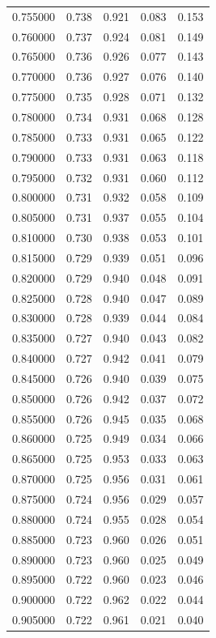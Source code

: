\begin{table}[htbp]
\begin{tabular}{lllll}
0.755000 & 0.738 & 0.921 & 0.083 & 0.153 \\
0.760000 & 0.737 & 0.924 & 0.081 & 0.149 \\
0.765000 & 0.736 & 0.926 & 0.077 & 0.143 \\
0.770000 & 0.736 & 0.927 & 0.076 & 0.140 \\
0.775000 & 0.735 & 0.928 & 0.071 & 0.132 \\
0.780000 & 0.734 & 0.931 & 0.068 & 0.128 \\
0.785000 & 0.733 & 0.931 & 0.065 & 0.122 \\
0.790000 & 0.733 & 0.931 & 0.063 & 0.118 \\
0.795000 & 0.732 & 0.931 & 0.060 & 0.112 \\
0.800000 & 0.731 & 0.932 & 0.058 & 0.109 \\
0.805000 & 0.731 & 0.937 & 0.055 & 0.104 \\
0.810000 & 0.730 & 0.938 & 0.053 & 0.101 \\
0.815000 & 0.729 & 0.939 & 0.051 & 0.096 \\
0.820000 & 0.729 & 0.940 & 0.048 & 0.091 \\
0.825000 & 0.728 & 0.940 & 0.047 & 0.089 \\
0.830000 & 0.728 & 0.939 & 0.044 & 0.084 \\
0.835000 & 0.727 & 0.940 & 0.043 & 0.082 \\
0.840000 & 0.727 & 0.942 & 0.041 & 0.079 \\
0.845000 & 0.726 & 0.940 & 0.039 & 0.075 \\
0.850000 & 0.726 & 0.942 & 0.037 & 0.072 \\
0.855000 & 0.726 & 0.945 & 0.035 & 0.068 \\
0.860000 & 0.725 & 0.949 & 0.034 & 0.066 \\
0.865000 & 0.725 & 0.953 & 0.033 & 0.063 \\
0.870000 & 0.725 & 0.956 & 0.031 & 0.061 \\
0.875000 & 0.724 & 0.956 & 0.029 & 0.057 \\
0.880000 & 0.724 & 0.955 & 0.028 & 0.054 \\
0.885000 & 0.723 & 0.960 & 0.026 & 0.051 \\
0.890000 & 0.723 & 0.960 & 0.025 & 0.049 \\
0.895000 & 0.722 & 0.960 & 0.023 & 0.046 \\
0.900000 & 0.722 & 0.962 & 0.022 & 0.044 \\
0.905000 & 0.722 & 0.961 & 0.021 & 0.040 \\

\end{tabular}
\end{table}
